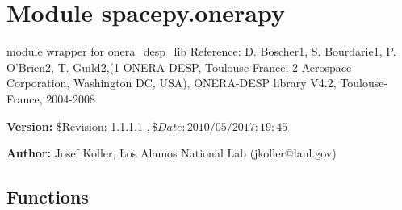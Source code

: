 %
%
%


\section{Module spacepy.onerapy}

    \label{spacepy:onerapy}
module wrapper for onera\_desp\_lib Reference: D. Boscher1, S. Bourdarie1, 
P. O'Brien2, T. Guild2,(1 ONERA-DESP, Toulouse France; 2 Aerospace 
Corporation, Washington DC, USA), ONERA-DESP library V4.2, Toulouse-France,
2004-2008

\textbf{Version:} \$Revision: 1.1.1.1 $, \$Date: 2010/05/20 17:19:45 $



\textbf{Author:} Josef Koller, Los Alamos National Lab (jkoller@lanl.gov)





  \subsection{Functions}

    \label{spacepy:onerapy:get_Bfield}

    \vspace{0.5ex}

